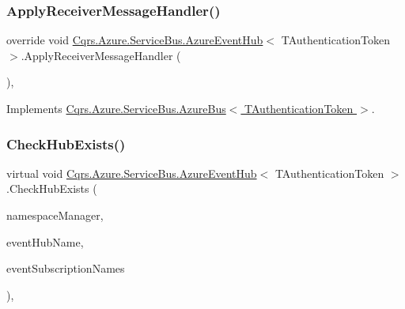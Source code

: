 \subsubsection{\texorpdfstring{Apply\+Receiver\+Message\+Handler()}{ApplyReceiverMessageHandler()}}
{\footnotesize\ttfamily override void \hyperlink{classCqrs_1_1Azure_1_1ServiceBus_1_1AzureEventHub}{Cqrs.\+Azure.\+Service\+Bus.\+Azure\+Event\+Hub}$<$ T\+Authentication\+Token $>$.Apply\+Receiver\+Message\+Handler (\begin{DoxyParamCaption}{ }\end{DoxyParamCaption})\hspace{0.3cm}{\ttfamily [protected]}, {\ttfamily [virtual]}}



Implements \hyperlink{classCqrs_1_1Azure_1_1ServiceBus_1_1AzureBus_aad25a164e9e526c59d8ef98635c98095}{Cqrs.\+Azure.\+Service\+Bus.\+Azure\+Bus$<$ T\+Authentication\+Token $>$}.

\mbox{\label{classCqrs_1_1Azure_1_1ServiceBus_1_1AzureEventHub_af9cafb2d7025844b0bf37ee6a6a0f635}} 
\subsubsection{\texorpdfstring{Check\+Hub\+Exists()}{CheckHubExists()}}
{\footnotesize\ttfamily virtual void \hyperlink{classCqrs_1_1Azure_1_1ServiceBus_1_1AzureEventHub}{Cqrs.\+Azure.\+Service\+Bus.\+Azure\+Event\+Hub}$<$ T\+Authentication\+Token $>$.Check\+Hub\+Exists (\begin{DoxyParamCaption}\item[{Namespace\+Manager}]{namespace\+Manager,  }\item[{string}]{event\+Hub\+Name,  }\item[{string}]{event\+Subscription\+Names }\end{DoxyParamCaption})\hspace{0.3cm}{\ttfamily [protected]}, {\ttfamily [virtual]}}

\mbox{\label{classCqrs_1_1Azure_1_1ServiceBus_1_1AzureEventHub_af43ec28c427d2d45370ef2401864db4b}} 
